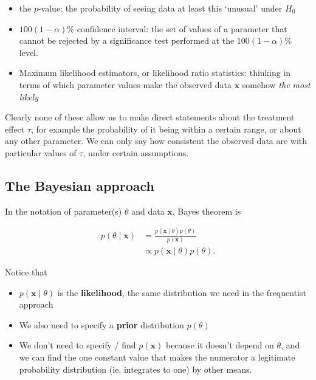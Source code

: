 \documentclass[
  openany]{book}
\providecommand{\tightlist}{%
  \setlength{\itemsep}{0pt}\setlength{\parskip}{0pt}}
\theoremstyle{definition}
\theoremstyle{definition}
\theoremstyle{definition}
\theoremstyle{definition}
\theoremstyle{remark}
\begin{document}
\begin{itemize}
\tightlist
\item
  the \(p\)-value: the probability of seeing data at least this `unusual' under \(H_0\)
\item
  \(100\left(1-\alpha\right)\%\) confidence interval: the set of values of a parameter that cannot be rejected by a significance test performed at the \(100\left(1-\alpha\right)\%\) level.
\item
  Maximum likelihood estimators, or likelihood ratio statistics: thinking in terms of which parameter values make the observed data \(\mathbf{x}\) somehow \emph{the most likely}
\end{itemize}

Clearly none of these allow us to make direct statements about the treatment effect \(\tau\), for example the probability of it being within a certain range, or about any other parameter. We can only say how consistent the observed data are with particular values of \(\tau\), under certain assumptions.

\subsection*{The Bayesian approach}\label{the-bayesian-approach-1}

In the notation of parameter(s) \(\theta\) and data \(\mathbf{x}\), Bayes theorem is

\begin{align*}
p\left(\theta\mid{\mathbf{x}}\right) &= \frac{p\left(\mathbf{x}\mid\theta\right)p\left(\theta\right)}{p\left(\mathbf{x}\right)}\\
&\propto p\left(\mathbf{x}\mid\theta\right)p\left(\theta\right).
\end{align*}

Notice that

\begin{itemize}
\tightlist
\item
  \(p\left(\mathbf{x}\mid\theta\right)\) is the \textbf{likelihood}, the same distribution we need in the frequentist approach
\item
  We also need to specify a \textbf{prior} distribution \(p\left(\theta\right)\)
\item
  We don't need to specify / find \(p\left(\mathbf{x}\right)\) because it doesn't depend on \(\theta\), and we can find the one constant value that makes the numerator a legitimate probability distribution (ie. integrates to one) by other means.
\end{itemize}
\end{document}
